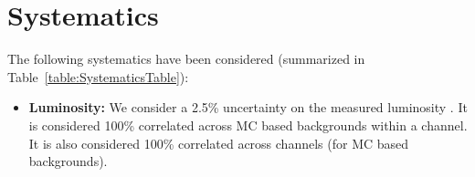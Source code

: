 \section{Systematics}\label{sec:systematics}
The following systematics have been considered (summarized in Table~\ref{table:SystematicsTable}):

\begin{itemize}
%

  \item \textbf{Luminosity:} We consider a 2.5\% uncertainty on the measured luminosity \cite{REFLUMI}. It is considered 100\% correlated across MC based 
backgrounds within a channel. It is also considered 100\% correlated across channels (for MC based backgrounds).


\end{itemize}
